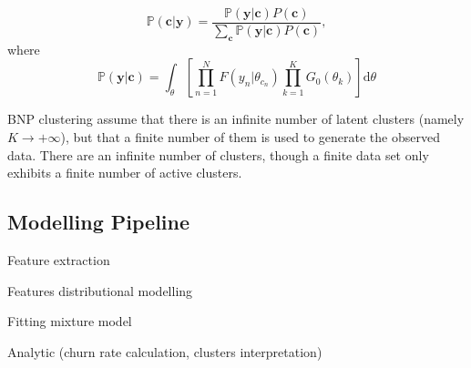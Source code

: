 \begin{equation}
\mathbb{P} (\mathbf{c} | \mathbf{y}) = \frac{\mathbb{P}(\mathbf{y} | \mathbf{c}) P(\mathbf{c})}{\sum_{\mathbf{c}} \mathbb{P}(\mathbf{y} | \mathbf{c}) P(\mathbf{c})},
\end{equation}
where
\begin{equation}
\mathbb{P}(\mathbf{y} | \mathbf{c}) = \int_\theta \left[ \prod_{n=1}^N F(y_n | \theta_{c_n}) \prod_{k=1}^K G_0 (\theta_k) \right] \text{d} \theta
\end{equation}


BNP clustering assume that there is an infinite number of latent clusters (namely $K \rightarrow +\infty$), but that a finite number of them is used to generate the observed data. There are an infinite number of clusters, though a finite data set only exhibits a finite number of active clusters.

\subsection{Modelling Pipeline}

Feature extraction

Features distributional modelling

Fitting mixture model

Analytic (churn rate calculation, clusters interpretation)